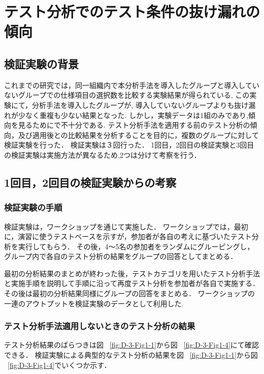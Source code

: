 \documentclass[10pt,a4j]{jarticle}
\begin{document}
\section{テスト分析でのテスト条件の抜け漏れの傾向}\label{chap:3}
\subsection{検証実験の背景} \label{sec:3-1}
これまでの研究では，同一組織内で本分析手法を導入したグループと導入していないグループでの仕様項目の選択数を比較する実験結果が得られている,
この実験にて，分析手法を導入したグループが, 導入していないグループよりも抜け漏れが少なく重複も少ない結果となった.
しかし，実験データは1組のみであり,傾向を見るためにで不十分である.
テスト分析手法を適用する前のテスト分析の傾向，及び適用後との比較結果を分析することを目的に，複数のグループに対して検証実験を行った．
検証実験は３回行った．
1回目，2回目の検証実験と3回目の検証実験は実施方法が異なるため,2つは分けて考察を行う．

\subsection{1回目，2回目の検証実験からの考察}
\subsubsection{検証実験の手順}
検証実験は，ワークショップを通じて実施した．
ワークショップでは，最初に，演習に使うテストベースを示すが，参加者が各自の考えに基づいたテスト分析を実行してもらう．
その後，4〜5名の参加者をランダムにグルーピングし，グループ内で各自のテスト分析の結果をグループの回答としてまとめる．

最初の分析結果のまとめが終わった後，テストカテゴリを用いたテスト分析手法と実施手順を説明して手順に沿って再度テスト分析を参加者が各自で実施する．
その後は最初の分析結果同様にグループの回答をまとめる．
ワークショップの一連のアウトプットを検証実験のデータとして利用した.

\subsubsection{テスト分析手法適用しないときのテスト分析の結果}

テスト分析結果のばらつきは図 ~\ref{fig:D-3-Fig1-1}から図 ~\ref{fig:D-3-Fig1-4}にて確認できる．
検証実験による典型的なテスト分析の結果を図 ~\ref{fig:D-3-Fig1-1}から図 ~\ref{fig:D-3-Fig1-4}でいくつか示す．
\end{document}
